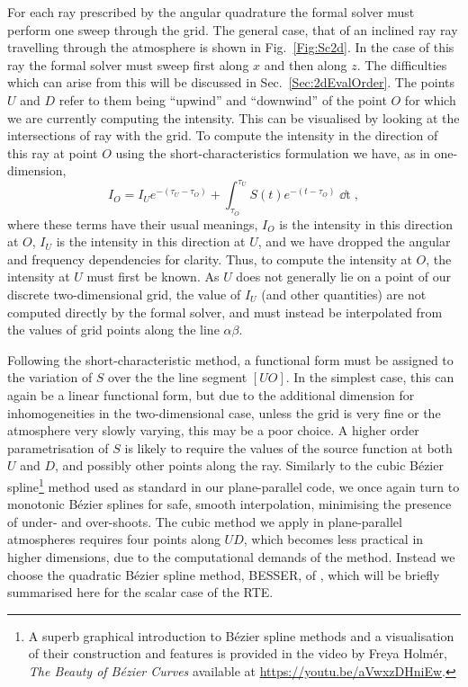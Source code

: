 For each ray prescribed by the angular quadrature the formal solver must perform one sweep through the grid.
The general case, that of an inclined ray ray travelling through the atmosphere is shown in Fig.~\ref{Fig:Sc2d}.
In the case of this ray the formal solver must sweep first along $x$ and then along $z$.
The difficulties which can arise from this will be discussed in Sec.~\ref{Sec:2dEvalOrder}.
The points $U$ and $D$ refer to them being ``upwind'' and ``downwind'' of the point $O$ for which we are currently computing the intensity.
This can be visualised by looking at the intersections of ray with the grid.
To compute the intensity in the direction of this ray at point $O$ using the short-characteristics formulation we have, as in one-dimension,
\begin{equation}\label{Eq:MiniScDefinition}
   I_O = I_U e^{-(\tau_U - \tau_O)} + \int_{\tau_O}^{\tau_U} S(t) e^{-(t - \tau_O)} \mathop{\dd{}t},
\end{equation}
where these terms have their usual meanings, $I_O$ is the intensity in this direction at $O$, $I_U$ is the intensity in this direction at $U$, and we have dropped the angular and frequency dependencies for clarity.
Thus, to compute the intensity at $O$, the intensity at $U$ must first be known.
As $U$ does not generally lie on a point of our discrete two-dimensional grid, the value of $I_U$ (and other quantities) are not computed directly by the formal solver, and must instead be interpolated from the values of grid points along the line $\alpha\beta$.

Following the short-characteristic method, a functional form must be assigned to the variation of $S$ over the the line segment $[UO]$.
In the simplest case, this can again be a linear functional form, but due to the additional dimension for inhomogeneities in the two-dimensional case, unless the grid is very fine or the atmosphere very slowly varying, this may be a poor choice.
A higher order parametrisation of $S$ is likely to require the values of the source function at both $U$ and $D$, and possibly other points along the ray.
Similarly to the cubic Bézier spline\footnote{A superb graphical introduction to Bézier spline methods and a visualisation of their construction and features is provided in the video by Freya Holmér, \emph{The Beauty of Bézier Curves} available at \url{https://youtu.be/aVwxzDHniEw}.} method used as standard in our plane-parallel code, we once again turn to monotonic Bézier splines for safe, smooth interpolation, minimising the presence of under- and over-shoots.
The cubic method we apply in plane-parallel atmospheres requires four points along $UD$, which becomes less practical in higher dimensions, due to the computational demands of the method.
Instead we choose the quadratic Bézier spline method, BESSER, of \citet{Stepan2013}, which will be briefly summarised here for the scalar case of the RTE.

